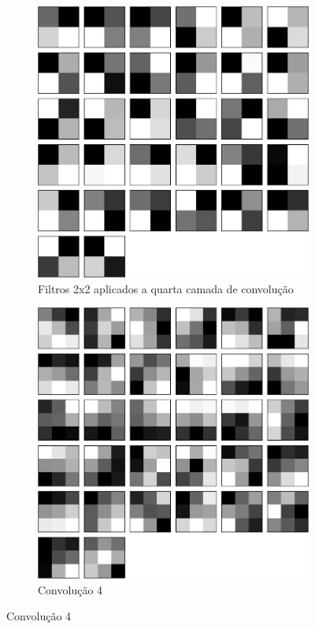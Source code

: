 \documentclass[
	12pt,				%
	oneside,			%
	a4paper,			%
	english,			%
	french,				%
	spanish,			%
	brazil,				%
	]{abntex2}
\begin{document}
\begin{center}
\begin{figure}[H]
	\begin{subfigure}{.8\textwidth}
		\centering
		\includegraphics[width=.6\linewidth]{images/fabio/resultados/network_3/filter_convolution2d_4}%
		\caption{Filtros 2x2 aplicados a quarta camada de convolução}		
		\label{fig:filtros2x2_4}	
	\end{subfigure}%
	
	\begin{subfigure}{.8\textwidth}
		\centering
		\includegraphics[width=.6\linewidth]{images/fabio/resultados/network_3/input_1_layer_convolution2d_4}
		\caption{Convolução 4}
	\end{subfigure}%
	

\end{figure}
\end{center}
\end{document}
